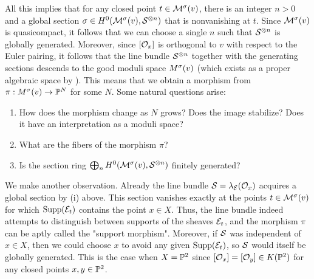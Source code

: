 \documentclass[letterpaper,10pt]{article}
\theoremstyle{remark}
\begin{document}
All this implies that for any closed point $t \in \mathcal{M}^\sigma(v)$, there is an integer $n > 0$ and a global section $\sigma \in H^0(\mathcal{M}^\sigma(v), \mathcal{S}^{\otimes n})$ that is nonvanishing at $t$. Since $\mathcal{M}^\sigma(v)$ is quasicompact, it follows that we can choose a single $n$ such that $\mathcal{S}^{\otimes n}$ is globally generated. Moreover, since $[\mathcal{O}_x]$ is orthogonal to $v$ with respect to the Euler pairing, it follows that the line bundle $\mathcal{S}^{\otimes n}$ together with the generating sections descends to the good moduli space $M^\sigma(v)$ (which exists as a proper algebraic space by \cite{AHLH}). This means that we obtain a morphism from $\pi: M^\sigma(v) \to \mathbb{P}^N$ for some $N$. Some natural questions arise:
\begin{enumerate}[1)]
    \item How does the morphism change as $N$ grows? Does the image stabilize? Does it have an interpretation as a moduli space?
    \item What are the fibers of the morphism $\pi$?
    \item Is the section ring $\bigoplus_n H^0(\mathcal{M}^\sigma(v), \mathcal{S}^{\otimes n})$ finitely generated?
\end{enumerate}
We make another observation. Already the line bundle $\mathcal{S} = \lambda_{\mathcal{E}}(\mathcal{O}_x)$ acquires a global section by (i) above. This section vanishes exactly at the points $t \in \mathcal{M}^\sigma(v)$ for which $\operatorname{\mathrm{Supp}}(\mathcal{E}_t)$ contains the point $x \in X$. Thus, the line bundle indeed attempts to distinguish between supports of the sheaves $\mathcal{E}_t$, and the morphism $\pi$ can be aptly called the "support morphism". Moreover, if $\mathcal{S}$ was independent of $x \in X$, then we could choose $x$ to avoid any given $\operatorname{\mathrm{Supp}}(\mathcal{E}_t)$, so $\mathcal{S}$ would itself be globally generated. This is the case when $X = \mathbb{P}^2$ since $[\mathcal{O}_x] = [\mathcal{O}_y] \in K(\mathbb{P}^2)$ for any closed points $x,y \in \mathbb{P}^2$.







\end{document}
